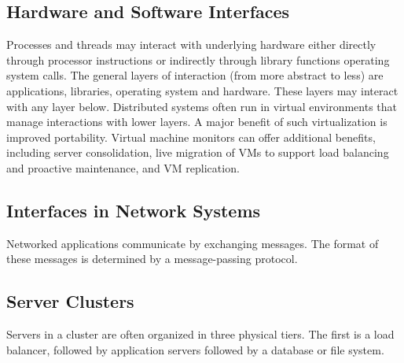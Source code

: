 \documentclass[12pt,titlepage]{article}
\begin{document}
    \subsection{Hardware and Software Interfaces}
      Processes and threads may interact with underlying hardware either directly through processor instructions or indirectly through library functions
      operating system calls. The general layers of interaction (from more abstract to less) are applications, libraries, operating system and hardware.
      These layers may interact with any layer below. Distributed systems often run in virtual environments that manage interactions with lower layers.
      A major benefit of such virtualization is improved portability. Virtual machine monitors can offer additional benefits, including server consolidation,
      live migration of VMs to support load balancing and proactive maintenance, and VM replication.

    \subsection{Interfaces in Network Systems}
      Networked applications communicate by exchanging messages. The format of these messages is determined by a message-passing protocol.

    \subsection{Server Clusters}
      Servers in a cluster are often organized in three physical tiers. The first is a load balancer, followed by application servers followed by a database
      or file system.
\end{document}
